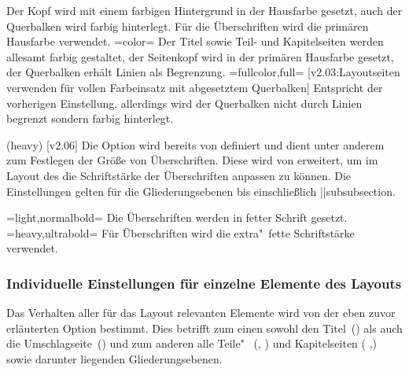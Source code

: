 \begin{DeclareEntity*}{}
\begin{DeclareEntity*}{}
\begin{DeclareEntity*}{}
\begin{Declaration}
\begin{DeclareValues}
  Der Kopf wird mit einem farbigen Hintergrund in der Hausfarbe gesetzt, auch 
  der Querbalken wird farbig hinterlegt. Für die Überschriften wird die 
  primären Hausfarbe verwendet.
\itemval=color=
  Der Titel sowie Teil- und Kapitelseiten werden allesamt farbig gestaltet, 
  der Seitenkopf wird in der primären Hausfarbe  gesetzt, der 
  Querbalken erhält Linien als Begrenzung.
\itemval=fullcolor,full=%
    [v2.03:Layoutseiten verwenden für  vollen
      Farbeinsatz mit abgesetztem Querbalken]
  Entspricht der vorherigen Einstellung, allerdings wird der Querbalken nicht 
  durch Linien begrenzt sondern farbig hinterlegt.
\end{DeclareValues}
%
\end{Declaration}

\begin{Declaration}
  {}
  (heavy)
  [v2.06]
Die Option  wird bereits von \KOMAScript definiert und 
dient unter anderem zum Festlegen der Größe von Überschriften. Diese wird von 
\TUDScript erweitert, um im Layout des \CDs die Schriftstärke der Überschriften 
anpassen zu können. Die Einstellungen gelten für die Gliederungsebenen bis 
einschließlich \Macro||{subsubsection}.
\begin{DeclareValues}
\itemval=light,normalbold=
  Die Überschriften werden in fetter Schrift gesetzt.
\itemval=heavy,ultrabold=
  Für Überschriften wird die extra"~fette Schriftstärke verwendet.
\end{DeclareValues}
\end{Declaration}



\subsubsection{Individuelle Einstellungen für einzelne Elemente des Layouts}
%
\newcommand*\cdalias{false,true,lightcolor,barcolor,bicolor,color,fullcolor}
%
Das Verhalten aller für das Layout relevanten Elemente wird von der eben zuvor 
erläuterten Option  bestimmt. Dies betrifft zum einen sowohl 
den Titel~() als auch die Umschlagseite~() 
und zum anderen alle Teile"~ (, ) und Kapitelseiten 
( ,) sowie darunter liegenden Gliederungsebenen.


\end{DeclareEntity*}
\end{DeclareEntity*}
\end{DeclareEntity*}
